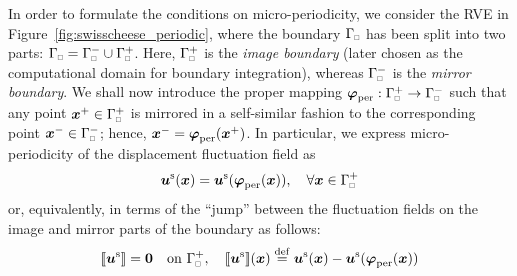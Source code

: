 \documentclass{bmcart}
\newcommand{\tikzsetnextfilename}[1]{}
\newcommand{\tikzinput}[1]{\texttt{[image: \#1]}}
\newcommand{\figref}[1]{Figure~\ref{#1}}
\DeclarePairedDelimiter{\jmp}{[\![}{]\!]}
\newcommand{\per}{\mathrm{per}}
\newcommand{\rve}{
  {\mathchoice
   {\mbox{\scalebox{0.67}{$\Box$}}}
   {\mbox{\scalebox{0.67}{$\Box$}}}
   {\mbox{\scalebox{0.5}{$\Box$}}}
   {\mbox{\scalebox{0.375}{$\Box$}}}
  }
}
\begin{document}
In order to formulate the conditions on micro-periodicity, we consider the RVE in \figref{fig:swisscheese_periodic}, where the boundary $\Gamma_\rve$ has been split into two parts: $\Gamma_\rve=\Gamma_\rve^- \cup \Gamma_\rve^+$.
Here, $\Gamma_\rve^+$ is the \emph{image boundary} (later chosen as the computational domain for boundary integration), whereas $\Gamma_\rve^-$ is the \emph{mirror boundary}.
We shall now introduce the proper mapping $\ta{\varphi}_\per:\Gamma_\rve^+ \rightarrow \Gamma_\rve^-$ such that any point $\ta{x}^+\in\Gamma_\rve^+$ is mirrored in a self-similar fashion to the corresponding point $\ta{x}^-\in\Gamma_\rve^-$; hence, $\ta{x}^-=\ta{\varphi}_\per(\ta{x}^+)$.
In particular, we express micro-periodicity of the displacement fluctuation field as
\begin{equation}
    \ta{u}^\fluct(\ta{x}) = \ta{u}^\fluct(\ta{\varphi}_\per(\ta{x})), \quad
    \forall \ta{x}\in\Gamma_\rve^+
\label{eq21}
\end{equation}
or, equivalently, in terms of the ``jump'' between the fluctuation fields on the image and mirror parts of the boundary as follows:
\begin{equation}
    \jmp{\ta{u}^\fluct} = \ta{0} \quad \makebox{on } \Gamma_\rve^+, \quad
    \jmp{\ta{u}^\fluct}(\ta{x}) \defeq \ta{u}^\fluct(\ta{x})-\ta{u}^\fluct(\ta{\varphi}_\per(\ta{x}))
\label{eq22}
\end{equation}
\end{document}
